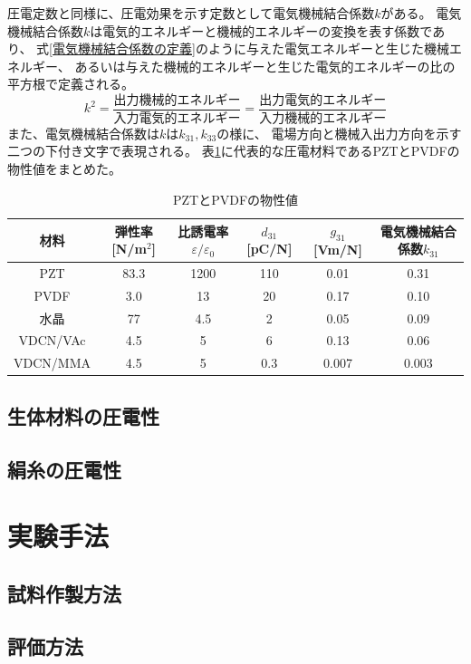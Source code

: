 \documentclass[dvipdfmx,12pt,a4paper]{jreport}
\begin{document}
			圧電定数と同様に、圧電効果を示す定数として電気機械結合係数$k$がある。
			電気機械結合係数$k$は電気的エネルギーと機械的エネルギーの変換を表す係数であり、
			式\ref{電気機械結合係数の定義}のように与えた電気エネルギーと生じた機械エネルギー、
			あるいは与えた機械的エネルギーと生じた電気的エネルギーの比の平方根で定義される。
			\begin{equation}
			k^2=\frac{\mbox{出力機械的エネルギー}}{\mbox{入力電気的エネルギー}}=
			\frac{\mbox{出力電気的エネルギー}}{\mbox{入力機械的エネルギー}}
			\label{電気機械結合係数の定義}
			\end{equation}
			また、電気機械結合係数は$k$は$k_{31}, k_{33}$の様に、
			電場方向と機械入出力方向を示す二つの下付き文字で表現される。
			表\ref{圧電材料}に代表的な圧電材料であるPZTとPVDFの物性値をまとめた。
			\begin{table}[h]
				\centering
				\caption{PZTとPVDFの物性値}
				\label{圧電材料}
				\begin{tabular}{c|ccccc}\hline
					材料&弾性率[N/m$^2$]&比誘電率$\varepsilon/\varepsilon_0$&$d_{31}$[pC/N]&$g_{31}$[Vm/N]&電気機械結合係数$k_{31}$ \\ \hline \hline
					PZT&83.3&1200&110&0.01&0.31 \\
					PVDF&3.0&13&20&0.17&0.10 \\ 
					水晶&77&4.5&2&0.05&0.09 \\
					VDCN/VAc&4.5&5&6&0.13&0.06 \\ 
					VDCN/MMA&4.5&5&0.3&0.007&0.003 \\ \hline
				\end{tabular} 
			\end{table}
			\section{生体材料の圧電性}
			\section{絹糸の圧電性}

	\chapter{実験手法}
		\section{試料作製方法}
		\section{評価方法}
\end{document}
